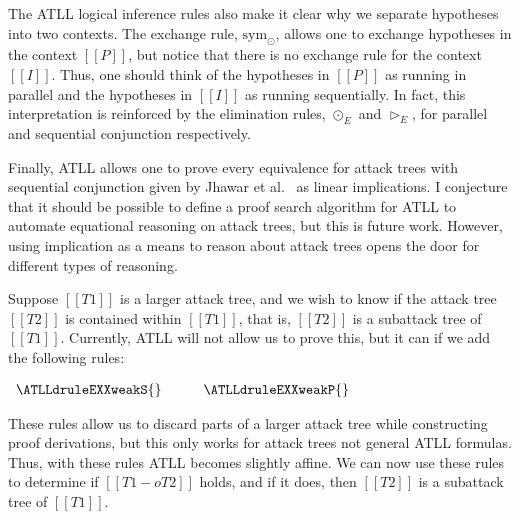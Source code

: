 The ATLL logical inference rules also make it clear why we separate
hypotheses into two contexts.  The exchange rule, $\text{sym}_\odot$,
allows one to exchange hypotheses in the context $[[P]]$, but notice
that there is no exchange rule for the context $[[I]]$.  Thus, one
should think of the hypotheses in $[[P]]$ as running in parallel and
the hypotheses in $[[I]]$ as running sequentially.  In fact, this
interpretation is reinforced by the elimination rules, $\odot_E$ and
$\rhd_E$, for parallel and sequential conjunction respectively.

Finally, ATLL allows one to prove every equivalence for attack trees
with sequential conjunction given by Jhawar et al.~\cite{Jhawar:2015}
as linear implications.  I conjecture that it should be possible to
define a proof search algorithm for ATLL to automate equational
reasoning on attack trees, but this is future work.  However, using
implication as a means to reason about attack trees opens the door for
different types of reasoning.

Suppose $[[T1]]$ is a larger attack tree, and we wish to know if the
attack tree $[[T2]]$ is contained within $[[T1]]$, that is, $[[T2]]$
is a subattack tree of $[[T1]]$.  Currently, ATLL will not allow us to
prove this, but it can if we add the following rules:
\begin{center}
  \begin{math}
    \begin{array}{lll}
      \ATLLdruleEXXweakS{} & \quad & \ATLLdruleEXXweakP{}
    \end{array}
  \end{math}
\end{center}
These rules allow us to discard parts of a larger attack tree while
constructing proof derivations, but this only works for attack trees
not general ATLL formulas.  Thus, with these rules ATLL becomes
slightly affine.  We can now use these rules to determine if
$[[T1 -o T2]]$ holds, and if it does, then $[[T2]]$ is a
subattack tree of $[[T1]]$.
